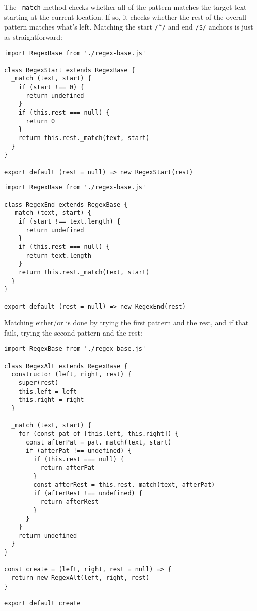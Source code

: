 \documentclass[krantzl]{krantz}
\begin{document}
\noindent The \texttt{\_match} method checks whether all of the pattern matches the target text starting at the current location.
If so, it checks whether the rest of the overall pattern matches what's left.
Matching the start \texttt{/{\textasciicircum}/} and end \texttt{/\$/} anchors is just as straightforward:


\begin{lstlisting}[frame=single,frameround=tttt]
import RegexBase from './regex-base.js'

class RegexStart extends RegexBase {
  _match (text, start) {
    if (start !== 0) {
      return undefined
    }
    if (this.rest === null) {
      return 0
    }
    return this.rest._match(text, start)
  }
}

export default (rest = null) => new RegexStart(rest)
\end{lstlisting}



\begin{lstlisting}[frame=single,frameround=tttt]
import RegexBase from './regex-base.js'

class RegexEnd extends RegexBase {
  _match (text, start) {
    if (start !== text.length) {
      return undefined
    }
    if (this.rest === null) {
      return text.length
    }
    return this.rest._match(text, start)
  }
}

export default (rest = null) => new RegexEnd(rest)
\end{lstlisting}



Matching either/or is done by trying the first pattern and the rest,
and if that fails,
trying the second pattern and the rest:


\begin{lstlisting}[frame=single,frameround=tttt]
import RegexBase from './regex-base.js'

class RegexAlt extends RegexBase {
  constructor (left, right, rest) {
    super(rest)
    this.left = left
    this.right = right
  }

  _match (text, start) {
    for (const pat of [this.left, this.right]) {
      const afterPat = pat._match(text, start)
      if (afterPat !== undefined) {
        if (this.rest === null) {
          return afterPat
        }
        const afterRest = this.rest._match(text, afterPat)
        if (afterRest !== undefined) {
          return afterRest
        }
      }
    }
    return undefined
  }
}

const create = (left, right, rest = null) => {
  return new RegexAlt(left, right, rest)
}

export default create
\end{lstlisting}
\end{document}
